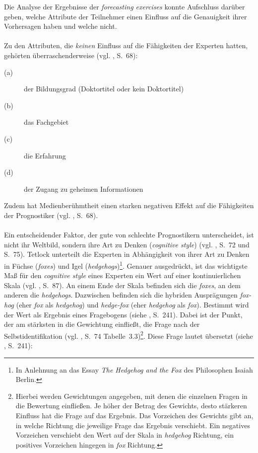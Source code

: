 Die Analyse der Ergebnisse der \emph{forecasting exercises} konnte Aufschluss
darüber geben, welche Attribute der Teilnehmer einen Einfluss auf die
Genauigkeit ihrer Vorhersagen haben und welche nicht. \\ \\
Zu den Attributen, die \emph{keinen} Einfluss auf die Fähigkeiten der Experten
hatten, gehörten überraschenderweise (vgl. \cite{Tetlock}, S.~68):
\begin{description}
\item[(a)] der Bildungsgrad (Doktortitel oder kein Doktortitel)
\item[(b)] das Fachgebiet
\item[(c)] die Erfahrung
\item[(d)] der Zugang zu geheimen Informationen
\end{description}
Zudem hat Medienberühmtheit einen starken negativen Effekt auf die Fähigkeiten
der Prognostiker (vgl. \cite{Tetlock}, S.~68). \\ \\
Ein entscheidender Faktor, der gute von schlechte Prognostikern unterscheidet,
ist nicht ihr Weltbild, sondern ihre Art zu Denken (\emph{cognitive style})
(vgl. \cite{Tetlock}, S.~72 und S.~75). Tetlock unterteilt die Experten in
Abhängigkeit von ihrer Art zu Denken in Füchse (\emph{foxes}) und Igel
(\emph{hedgehogs})\footnote{
In Anlehnung an das Essay \emph{The Hedgehog and the Fox} des Philosophen Isaiah
Berlin.
}. Genauer ausgedrückt, ist das wichtigste Maß für den \emph{cognitive style}
eines Experten ein Wert auf einer kontinuierlichen Skala (vgl. \cite{Tetlock},
S.~87). An einem Ende der Skala befinden sich die \emph{foxes}, an dem anderen
die \emph{hedgehogs}. Dazwischen befinden sich die hybriden Ausprägungen
\emph{fox-hog} (eher \emph{fox} als \emph{hedgehog}) und \emph{hedge-fox} (eher
\emph{hedgehog} als \emph{fox}). Bestimmt wird der Wert als Ergebnis eines
Fragebogens (siehe \cite{Tetlock}, S.~241). Dabei ist der Punkt, der am
stärksten in die Gewichtung einfließt, die Frage nach der Selbstidentifikation
(vgl. \cite{Tetlock}, S.~74 Tabelle~3.3)\footnote{
Hierbei werden Gewichtungen angegeben, mit denen die einzelnen Fragen in
die Bewertung einfließen. Je höher der Betrag des Gewichts, desto stärkeren
Einfluss hat die Frage auf das Ergebnis. Das Vorzeichen des Gewichts gibt an,
in welche Richtung die jeweilige Frage das Ergebnis verschiebt. Ein negatives
Vorzeichen verschiebt den Wert auf der Skala in \emph{hedgehog} Richtung, ein
positives Vorzeichen hingegen in \emph{fox} Richtung.   
}. Diese Frage lautet übersetzt (siehe \cite{Tetlock}, S.~241):
